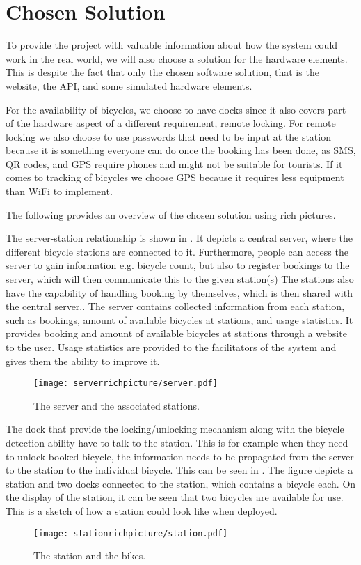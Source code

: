 \section{Chosen Solution}
To provide the project with valuable information about how the system could work in the real world, we will also choose a solution for the hardware elements.
This is despite the fact that only the chosen software solution, that is the website, the API, and some simulated hardware elements.

For the availability of bicycles, we choose to have docks since it also covers part of the hardware aspect of a different requirement, remote locking.  
For remote locking we also choose to use passwords that need to be input at the station because it is something everyone can do once the booking has been done, as SMS, QR codes, and GPS require phones and might not be suitable for tourists.
If it comes to tracking of bicycles we choose GPS because it requires less equipment than WiFi to implement.

The following provides an overview of the chosen solution using rich pictures.

The server-station relationship is shown in .
It depicts a central server, where the different bicycle stations are connected to it.
Furthermore, people can access the server to gain information e.g. bicycle count, but also to register bookings to the server, which will then communicate this to the given station(s)
The stations also have the capability of handling booking by themselves, which is then shared with the central server..
The server contains collected information from each station, such as bookings, amount of available bicycles at stations, and usage statistics.
It provides booking and amount of available bicycles at stations through a website to the user. 
Usage statistics are provided to the facilitators of the system and gives them the ability to improve it. 

\begin{figure}[h]
\centering
\texttt{[image: serverrichpicture/server.pdf]}
\caption{The server and the associated stations.}
\label{fig:ServerRichPicture}
\end{figure}

The dock that provide the locking/unlocking mechanism along with the bicycle detection ability have to talk to the station. 
This is for example when they need to unlock booked bicycle, the information needs to be propagated from the server to the station to the individual bicycle.
This can be seen in .
The figure depicts a station and two docks connected to the station, which contains a bicycle each. 
On the display of the station, it can be seen that two bicycles are available for use.
This is a sketch of how a station could look like when deployed.
\begin{figure}[h]
\centering
\texttt{[image: stationrichpicture/station.pdf]}
\caption{The station and the bikes.}
\label{fig:StationRichPicture}
\end{figure}